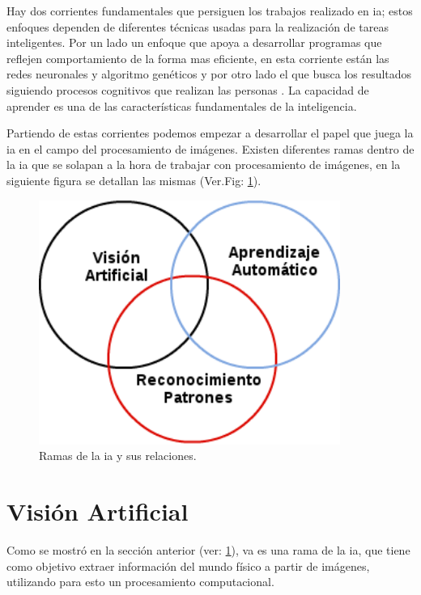 Hay dos corrientes fundamentales  que persiguen los trabajos realizado en \ac{ia}; estos enfoques dependen de diferentes técnicas usadas para la realización de tareas inteligentes. Por un lado un enfoque que apoya a desarrollar programas que reflejen comportamiento de la forma mas eficiente, en esta corriente están las redes neuronales y algoritmo genéticos y por otro lado el que busca los resultados siguiendo procesos cognitivos que realizan las personas \citep{inteligenciaACasali}. La capacidad de aprender es una de las características fundamentales de la inteligencia. 

Partiendo de estas corrientes podemos empezar a desarrollar el papel que juega la \ac{ia} en el campo del procesamiento de imágenes. Existen diferentes ramas dentro de la \ac{ia} que se solapan a la hora de trabajar con procesamiento de imágenes, en la siguiente figura se detallan las mismas (Ver.Fig: \ref{Fig: inteligenciartificial}).

\begin{figure}[h]
 \centering
  \includegraphics[height=8cm,keepaspectratio=true,clip=true]{imagenes/Logos/va_.png}
  \caption{Ramas de la \ac{ia} y sus relaciones.}
	\label{Fig: inteligenciartificial}
\end{figure}


\section{Visión Artificial}\label{sec:visionartificial}
Como se mostró en la sección anterior (ver: \ref{Fig: inteligenciartificial}), \ac{va} es una rama de la \ac{ia}, que tiene como objetivo extraer información del mundo físico a partir de imágenes, utilizando para esto un procesamiento computacional.

